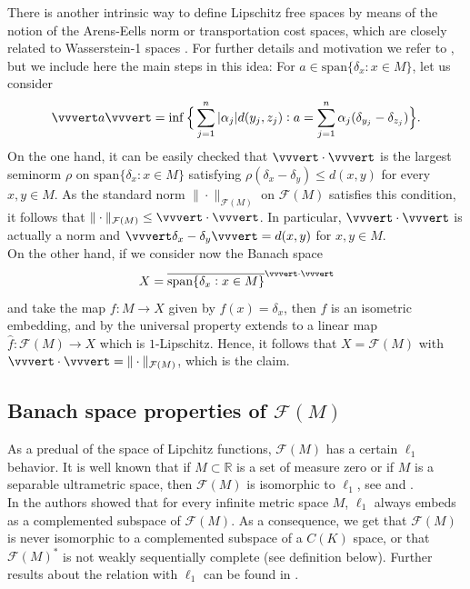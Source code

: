 \documentclass[12pt,leqno]{amsart}
\numberwithin{equation}{section} %
\theoremstyle{definition}
\numberwithin{equation}{section}
\def\Span{\mathrm{span}}
\begin{document}
There is another intrinsic way to define Lipschitz free spaces by means of the notion of the Arens-Eells norm or transportation cost spaces, which are closely related to Wasserstein-1 spaces \cite{OO19}. For further details and motivation we refer to \cite[Section 2.3]{Weaver}, but we include here the main steps in this idea: For $a\in \Span\{\delta_x: x\in M\}$, let us consider
$$\vvvert a \vvvert=\inf\Big\{\sum_{j=1}^{n}|\alpha_j| d(y_j,z_j): a=\sum_{j=1}^{n}\alpha_j(\delta_{y_j}-\delta_{z_j})\Big\}.$$
On the one hand, it can be easily checked that $\vvvert\cdot\vvvert$ is the largest seminorm $\rho$ on $\Span\{\delta_x: x\in M\}$ satisfying $\rho(\delta_x-\delta_y)\leq d(x,y)$ for every $x,y\in M$. As the standard norm $\|\cdot\|_{\mathcal F(M)}$ on $\mathcal F(M)$ satisfies this condition, it follows that $\|\cdot\|_{\mathcal F(M)}\leq\vvvert\cdot\vvvert$. In particular, $\vvvert\cdot\vvvert$ is actually a norm and $\vvvert\delta_x-\delta_y\vvvert=d(x,y)$ for $x,y\in M$.\\

On the other hand, if we consider now the Banach space $$X=\overline{\Span\{\delta_x: x\in M\}}^{\vvvert\cdot\vvvert}$$ and take the map $f:M\rightarrow X$ given by $f(x)=\delta_x$, then $f$ is an isometric embedding, and by the universal property extends to a linear map $\widehat{f}:\mathcal F(M)\rightarrow X$ which is $1$-Lipschitz. Hence, it follows that $X=\mathcal F(M)$ with $\vvvert\cdot\vvvert=\|\cdot\|_{\mathcal F(M)}$, which is the claim.


\subsection{Banach space properties of $\mathcal F(M)$}\label{ss:propertieslipfree}

As a predual of the space of Lipchitz functions, $\mathcal F(M)$ has a certain $\ell_1$ behavior. It is well known that if $M\subset\mathbb R$ is a set of measure zero or if $M$ is a separable ultrametric space, then $\mathcal F(M)$ is isomorphic to $\ell_1$, see \cite{god} and \cite{cutDou}.\\ 

In \cite{CDW} the authors showed that for every infinite metric space $M$, $\ell_1$ always embeds as a complemented subspace of $\mathcal F(M)$. As a consequence, we get that $\mathcal F(M)$ is never isomorphic to a complemented subspace of a $C(K)$ space, or that $\mathcal F(M)^*$ is not weakly sequentially complete (see definition below). Further results about the relation with $\ell_1$ can be found in \cite{APP,OO20}.\\
\end{document}
